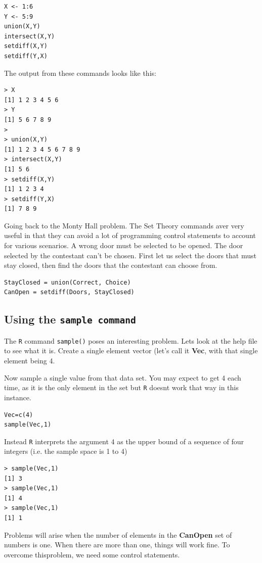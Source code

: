 \documentclass[11pt]{article} %
\begin{document}
\begin{verbatim}
X <- 1:6
Y <- 5:9
union(X,Y)
intersect(X,Y)
setdiff(X,Y)
setdiff(Y,X)
\end{verbatim}

The output from these commands looks like this:
\begin{verbatim}
> X
[1] 1 2 3 4 5 6
> Y
[1] 5 6 7 8 9
>
> union(X,Y)
[1] 1 2 3 4 5 6 7 8 9
> intersect(X,Y)
[1] 5 6
> setdiff(X,Y)
[1] 1 2 3 4
> setdiff(Y,X)
[1] 7 8 9
\end{verbatim}
Going back to the Monty Hall problem. The Set Theory commands aver very useful in that they can avoid a lot of programming control statements to account for various scenarios. A wrong door must be selected to be opened. The door selected by the contestant can't be
chosen. First let us select the doors that must stay closed, then find the doors that the contestant can choose from.

\begin{verbatim}
StayClosed = union(Correct, Choice)
CanOpen = setdiff(Doors, StayClosed)
\end{verbatim}


\subsection{Using the \texttt{sample command}}


The \texttt{R} command \texttt{sample()} poses an interesting problem. Lets look at the help file to see what it is.
Create a single element vector (let's call it \textbf{Vec}, with that single element being 4. 

Now sample a single value from that data set. You may expect to get 4 each time, as it is the only element in the set but \texttt{R} doesnt work that way in this instance.

\begin{verbatim}
Vec=c(4)
sample(Vec,1)
\end{verbatim}

Instead \texttt{R} interprets the argument 4 as the upper bound of a sequence of four integers (i.e. the sample space is 1 to 4)
\begin{verbatim}
> sample(Vec,1)
[1] 3
> sample(Vec,1)
[1] 4
> sample(Vec,1)
[1] 1
\end{verbatim}

Problems will arise when the number of elements in the \textbf{CanOpen} set of numbers is one.
When there are more than one, things will work fine.
To overcome thisproblem, we need some control statements.
\end{document}
